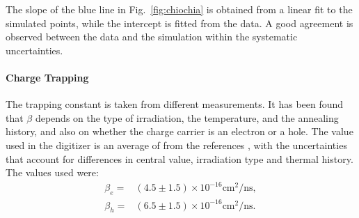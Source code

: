 \noindent
The slope of the blue line in Fig.~\ref{fig:chiochia} is obtained from a linear fit to the simulated points, while the intercept is fitted from the data. A good agreement is observed between the data and the simulation within the systematic uncertainties.
%





\paragraph*{Charge Trapping}
The trapping constant is taken from different measurements. It has been found that $\beta$ depends on the type of irradiation, the temperature, and the annealing history, and also on whether the charge carrier is an electron or a hole. The value used in the digitizer is an average of from the references \cite{Krasel:2004mi,Kramberger:2002zb,Alimonti:2003laa}, with the uncertainties that account for differences in central value, irradiation type and thermal history. The values used were:
\begin{equation*}
\begin{split}
\beta_e = & (4.5 \pm 1.5) \times 10^{-16} \text{cm}^2/\text{ns},\\
\beta_h = & (6.5 \pm 1.5) \times 10^{-16} \text{cm}^2/\text{ns}.
\end{split}
\end{equation*}

